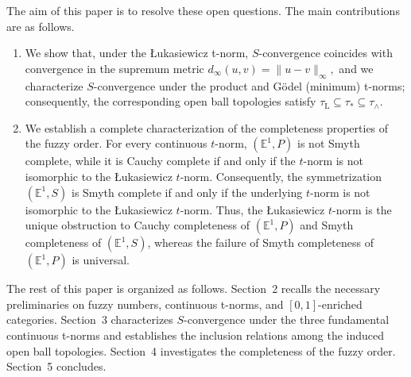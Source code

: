 \documentclass[preprint,3p,times]{elsarticle}
\theoremstyle{plain}
\theoremstyle{definition}
\newcommand{\Luk}{\mathrm{L}}
\numberwithin{equation}{section}
\begin{document}
The aim of this paper is to resolve these open questions. The main contributions are as follows.
\begin{enumerate}[label={(\arabic*)}]
\item We show that, under the {\L}ukasiewicz t-norm, \(S\)-convergence coincides with convergence in the supremum metric
\(
d_{\infty}(u,v)=\|u-v\|_{\infty},
\)
and we characterize \(S\)-convergence under the product and G\"odel (minimum) t-norms; consequently, the corresponding open ball topologies satisfy
\(
\tau_{\Luk}\subseteq\tau_{*}\subseteq\tau_{\wedge}.
\)
 \item We establish a complete characterization of the completeness properties of the fuzzy order. For every continuous \(t\)-norm, \((\mathbb{E}^1,P)\) is not Smyth complete, while it is Cauchy complete if and only if the \(t\)-norm is not isomorphic to the {\L}ukasiewicz \(t\)-norm. Consequently, the symmetrization \((\mathbb{E}^1,S)\) is Smyth complete if and only if the underlying \(t\)-norm is not isomorphic to the {\L}ukasiewicz \(t\)-norm. Thus, the {\L}ukasiewicz \(t\)-norm is the unique obstruction to Cauchy completeness of \((\mathbb{E}^1,P)\) and Smyth completeness of \((\mathbb{E}^1,S)\), whereas the failure of Smyth completeness of \((\mathbb{E}^1,P)\) is universal.

\end{enumerate}

The rest of this paper is organized as follows. Section~2 recalls the necessary preliminaries on fuzzy numbers, continuous t-norms, and \([0,1]\)-enriched categories. Section~3 characterizes \(S\)-convergence under the three fundamental continuous t-norms and establishes the inclusion relations among the induced open ball topologies. Section~4 investigates the completeness of the fuzzy order. Section~5 concludes.
\end{document}
